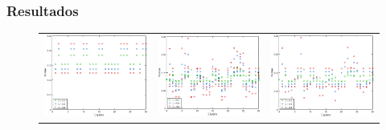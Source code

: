             \subsubsection*{Resultados}
                \begin{figure}
                    \begin{center}

                        \begin{tabular}{ccc}
                            \includegraphics{graficos/exp2-partidos-liga-afa1.pdf} & \includegraphics{graficos/exp2-partidos-liga-afa3.pdf} &
                            \includegraphics{graficos/exp2-partidos-liga-afa2.pdf}}

\end{tabular}
\end{center}
\end{figure}
